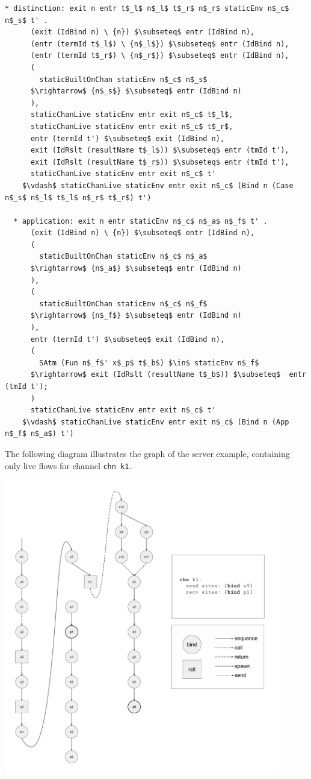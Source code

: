 \documentclass[letterpaper, 11pt]{extarticle}
\begin{document}
\begin{lstlisting}[language=logic, mathescape]
  * distinction: exit n entr t$_l$ n$_l$ t$_r$ n$_r$ staticEnv n$_c$ n$_s$ t' .
      (exit (IdBind n) \ {n}) $\subseteq$ entr (IdBind n),
      (entr (termId t$_l$) \ {n$_l$}) $\subseteq$ entr (IdBind n),
      (entr (termId t$_r$) \ {n$_r$}) $\subseteq$ entr (IdBind n),
      (
        staticBuiltOnChan staticEnv n$_c$ n$_s$
      $\rightarrow$ {n$_s$} $\subseteq$ entr (IdBind n)
      ),
      staticChanLive staticEnv entr exit n$_c$ t$_l$,
      staticChanLive staticEnv entr exit n$_c$ t$_r$,
      entr (termId t') $\subseteq$ exit (IdBind n),
      exit (IdRslt (resultName t$_l$)) $\subseteq$ entr (tmId t'),
      exit (IdRslt (resultName t$_r$)) $\subseteq$ entr (tmId t'),
      staticChanLive staticEnv entr exit n$_c$ t'
    $\vdash$ staticChanLive staticEnv entr exit n$_c$ (Bind n (Case n$_s$ n$_l$ t$_l$ n$_r$ t$_r$) t')

  * application: exit n entr staticEnv n$_c$ n$_a$ n$_f$ t' .
      (exit (IdBind n) \ {n}) $\subseteq$ entr (IdBind n),
      (
        staticBuiltOnChan staticEnv n$_c$ n$_a$
      $\rightarrow$ {n$_a$} $\subseteq$ entr (IdBind n)
      ),
      (
        staticBuiltOnChan staticEnv n$_c$ n$_f$
      $\rightarrow$ {n$_f$} $\subseteq$ entr (IdBind n)
      ),
      entr (termId t') $\subseteq$ exit (IdBind n),
      (
        SAtm (Fun n$_f$' x$_p$ t$_b$) $\in$ staticEnv n$_f$
      $\rightarrow$ exit (IdRslt (resultName t$_b$)) $\subseteq$  entr (tmId t');
      )
      staticChanLive staticEnv entr exit n$_c$ t'
    $\vdash$ staticChanLive staticEnv entr exit n$_c$ (Bind n (App n$_f$ n$_a$) t')
\end{lstlisting}


The following diagram illustrates the graph of the server example,
containing only live flows for channel \lstinline{chn k1}. \

\includegraphics[width=0.9\textwidth]{cml-graph-k1.pdf}
\end{document}

